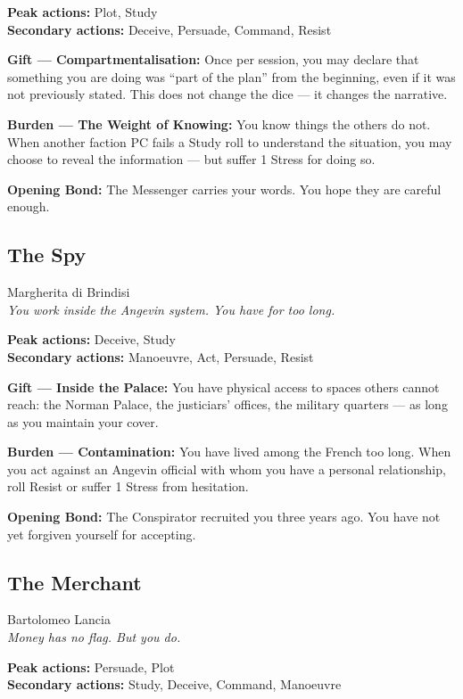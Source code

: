 \textbf{Peak actions:} Plot, Study\\
\textbf{Secondary actions:} Deceive, Persuade, Command, Resist

\textbf{Gift --- Compartmentalisation:} Once per session, you may
declare that something you are doing was ``part of the plan'' from
the beginning, even if it was not previously stated. This does not
change the dice — it changes the narrative.

\textbf{Burden --- The Weight of Knowing:} You know things the others
do not. When another faction PC fails a Study roll to understand the
situation, you may choose to reveal the information — but suffer
1 Stress for doing so.

\textbf{Opening Bond:} The Messenger carries your words.
You hope they are careful enough.

\filetto

\subsection{The Spy}
{\cinzel\footnotesize\color{grigionote} Margherita di Brindisi}\\
\textit{You work inside the Angevin system. You have for too long.}

\textbf{Peak actions:} Deceive, Study\\
\textbf{Secondary actions:} Manoeuvre, Act, Persuade, Resist

\textbf{Gift --- Inside the Palace:} You have physical access to
spaces others cannot reach: the Norman Palace, the justiciars' offices,
the military quarters — as long as you maintain your cover.

\textbf{Burden --- Contamination:} You have lived among the French
too long. When you act against an Angevin official with whom you have
a personal relationship, roll Resist or suffer 1 Stress from hesitation.

\textbf{Opening Bond:} The Conspirator recruited you three years ago.
You have not yet forgiven yourself for accepting.

\filetto

\subsection{The Merchant}
{\cinzel\footnotesize\color{grigionote} Bartolomeo Lancia}\\
\textit{Money has no flag. But you do.}

\textbf{Peak actions:} Persuade, Plot\\
\textbf{Secondary actions:} Study, Deceive, Command, Manoeuvre

